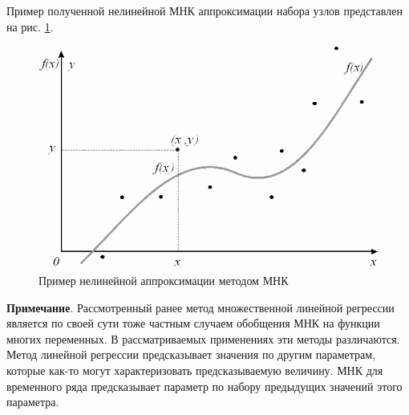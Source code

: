 	Пример полученной нелинейной МНК аппроксимации набора узлов представлен на рис. \ref{mnk}.
	
	\begin{figure}[h]
		\centering\includegraphics[width=.55\textwidth]{png/mnk.png}
		\caption{Пример нелинейной аппроксимации методом МНК}
		\label{mnk}
	\end{figure}

	\textbf{Примечание}. Рассмотренный ранее метод множественной линейной регрессии является по своей сути тоже частным случаем обобщения МНК на функции многих переменных. В рассматриваемых применениях эти методы различаются. Метод линейной регрессии предсказывает значения по другим параметрам, которые как-то могут характеризовать предсказываемую величину. МНК для временного ряда предсказывает параметр по набору предыдущих значений этого параметра.
	

